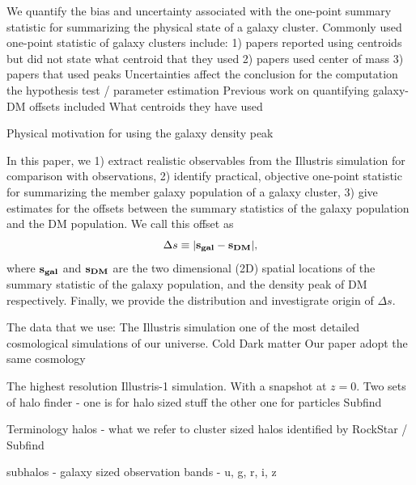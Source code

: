 \documentclass[usenatbib]{mn2e}
\begin{document}
We quantify the bias and uncertainty associated with the one-point summary
statistic for summarizing the physical state of a galaxy cluster. 
Commonly used one-point statistic of galaxy clusters include:
1) papers reported using centroids but did not state what centroid that they
used 
2) papers used center of mass 
3) papers that used peaks  
Uncertainties affect the conclusion for the computation the hypothesis test / parameter
estimation
Previous work on quantifying galaxy-DM offsets included  
What centroids they have used

Physical motivation for using the galaxy density peak 

In this paper, we 
1) extract realistic observables from the Illustris simulation for
comparison with observations, 2) identify practical, objective one-point statistic for 
summarizing the member galaxy population of a galaxy cluster, 3)	
give estimates for the offsets between the summary statistics of the galaxy  
population and the DM population. We call this offset as 
\begin{equation}
	\Delta s \equiv |\bf{s}_{gal} - \bf{s}_{DM}|,
\end{equation}
where $\bf{s}_{gal}$ and $\bf{s}_{DM}$ are the two dimensional (2D) spatial
locations of the summary statistic of the galaxy population, and the density
peak of DM respectively. 
Finally, we provide the distribution and investigrate origin of $\Delta s$. 

The data that we use: The Illustris simulation 
one of the most detailed cosmological simulations of our universe. 
Cold Dark matter 
Our paper adopt the same cosmology

The highest resolution Illustris-1 simulation. 
With a snapshot at $z=0$. 
Two sets of halo finder - one is for halo sized stuff 
the other one for particles 
Subfind 



Terminology 
halos - what we refer to cluster sized halos identified by RockStar  / Subfind 

subhalos - galaxy sized  
observation bands - u, g, r, i, z
\end{document}
